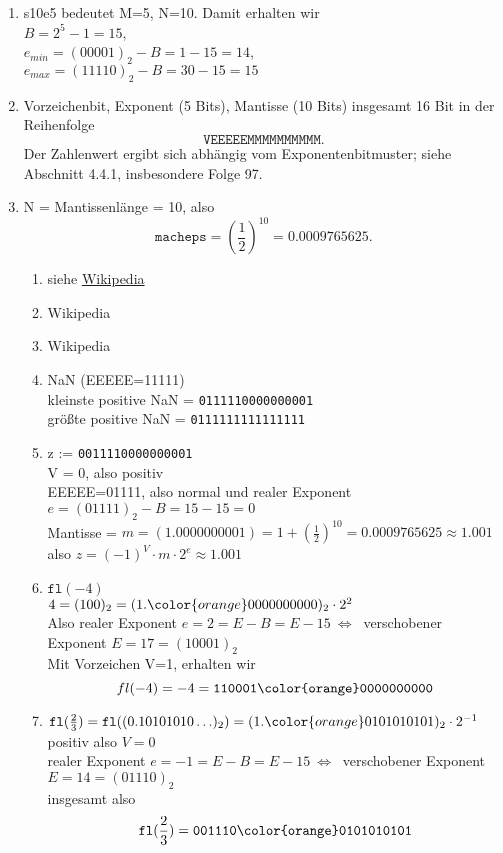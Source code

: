 \begin{enumerate}
	\item s10e5 bedeutet M=5, N=10. Damit erhalten wir \\
	$B = 2^5 - 1= 15$,\\
	$e_{min} = (00001)_2 - B = 1-15 = 14$,\\
	$e_{max} = (11110)_2 - B = 30-15 = 15$
	\item Vorzeichenbit, Exponent (5 Bits), Mantisse (10 Bits) insgesamt 16 Bit in der Reihenfolge
	$$\texttt{VEEEEEMMMMMMMMMM}.$$
	 Der Zahlenwert ergibt sich abhängig vom Exponentenbitmuster; siehe Abschnitt 4.4.1, insbesondere Folge 97.
	 \item N = Mantissenlänge = 10, also $$\texttt{macheps}=\left(\frac{1}{2}\right)^{10}  = 0.0009765625.$$
	\begin{enumerate}
			\item siehe  \href{https://en.wikipedia.org/wiki/Half-precision_floating-point_format#Half_precision_examples}{Wikipedia}
			\item Wikipedia
			\item Wikipedia
		\item NaN (EEEEE=11111)\\
			kleinste positive NaN =
			\texttt{0111110000000001}\\
			größte positive NaN =
\texttt{0111111111111111}
			\item z := \texttt{0011110000000001}\\
			V = 0, also positiv\\
			EEEEE=01111, also normal und realer Exponent $e = (01111)_2 - B = 15-15 = 0 $\\
			Mantisse = $m=(1.0000000001)=1+\left(\frac{1}{2}\right)^{10} = 0.0009765625 \approx 1.001$\\
			also $z = (-1)^V \cdot m \cdot 2^e \approx 1.001$
	\item $\texttt{fl}(-4)$\\
	$4 = (100)_2 = (1.{\color{orange}0000000000})_2 \cdot 2^2$\\
	Also realer Exponent $e = 2 = E - B = E - 15 ~\iff~$ verschobener Exponent $E=17=(10001)_2$\\
	Mit Vorzeichen V=1, erhalten wir
	$$fl(-4)= -4 = \texttt{110001{\color{orange}0000000000}} $$
	\item $\texttt{fl}(\frac{2}{3})= \texttt{fl}((0.10101010\ldots)_2)=(1.{\color{orange}0101010101})_2\cdot 2^{-1}$\\
	positiv also $V=0$\\
	realer Exponent $e = -1 = E - B = E - 15 ~\iff~$ verschobener Exponent $E=14=(01110)_2$\\
	insgesamt also 
		$$\texttt{fl}(\frac{2}{3})=\texttt{001110{\color{orange}0101010101}} $$
	\end{enumerate}
\end{enumerate}
